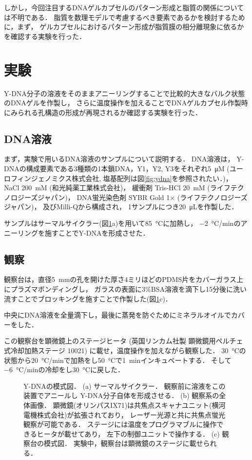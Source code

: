 しかし，今回注目するDNAゲルカプセルのパターン形成と脂質の関係については不明である．
脂質を数理モデルで考慮するべき要素であるかを検討するために，まず，
ゲルカプセルにおけるパターン形成が脂質膜の相分離現象に依るかを確認する実験を行った．

\section{実験}
Y-DNA分子の溶液をそのままアニーリングすることで比較的大きなバルク状態のDNAゲルを作製し，
さらに温度操作を加えることでDNAゲルカプセル作製時にみられる孔構造の形成が再現されるか確認する実験を行った．

\subsection{DNA溶液}
まず，実験で用いるDNA溶液のサンプルについて説明する．
DNA溶液は，
Y-DNAの構成要素である3種類の1本鎖DNA，Y1，Y2, Y3をそれぞれ\SI{5}{\micro M} (ユーロフィンジェノミクス株式会社, 塩基配列は図\ref{fig:ydna}を参照されたい．)，
NaCl \SI{200}{mM} (和光純薬工業株式会社)，
緩衝剤 Tris-HCl \SI{20}{mM} (ライフテクノロジーズジャパン)，
DNA蛍光染色剤 SYBR Gold 1× (ライフテクノロジーズジャパン)，
及びMilli-Qから構成され，
1サンプルにつき\SI{20}{\micro L}を作製した．

サンプルはサーマルサイクラー(図\ref{fig:equipments}a)を用いて\SI{85}{\celsius}に加熱し，
\SI{-2}{\celsius/min}のアニーリングを施すことでY-DNAを形成させた．

\subsection{観察}
観察台は，直径\SI{5}{mm}の孔を開けた厚さ4ミリほどのPDMS片をカバーガラス上にプラズマボンディングし，
ガラスの表面に3\%BSA溶液を滴下し15分後に洗い流すことでブロッキングを施すことで作製した(図\ref{fig:equipments}c)．

中央にDNA溶液を全量滴下し，最後に蒸発を防ぐためにミネラルオイルでカバーをした．

この観察台を顕微鏡上のステージヒータ
(英国リンカム社製 顕微鏡用ペルチェ式冷却加熱ステージ 10021)
に載せ，温度操作を加えながら観察した．
\SI{30}{\celsius}の状態から\SI{20}{\celsius/min}で加熱をし\SI{50}{\celsius}で\SI{1}{min}インキュベートする．
そして\SI{-6}{\celsius/min}の冷却をし\SI{30}{\celsius}に戻した．


\begin{figure}
\centering

\caption{Y-DNAの模式図．
    (a) サーマルサイクラー．
        観察前に溶液をこの装置でアニールし
        Y-DNA分子自体を形成させる．
    (b) 観察系の全体画像．
        顕微鏡(オリンパスIX71)は共焦点スキャナユニット(横河電機株式会社)が拡張されており，
        レーザー光源と共に共焦点蛍光観察が可能である．
        ステージには温度をプログラマブルに操作できるヒータが載せてあり，
        左下の制御ユニットで操作する．
    (c) 観察台の模式図．
        実験中，観察台は顕微鏡のステージに載せられる．
}

\label{fig:equipments}
\end{figure}


